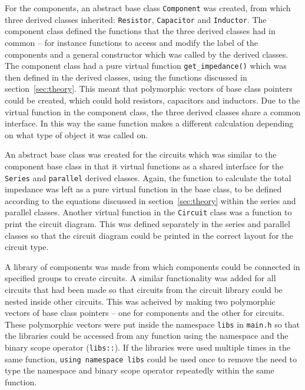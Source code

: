 \renewcommand{\lstlistingname}{Code snippet}

For the components, an abstract base class \verb!Component! was created, from which three derived classes inherited: \verb!Resistor!, \verb!Capacitor! and \verb!Inductor!. The component class defined the functions that the three derived classes had in common -- for instance functions to access and modify the label of the components and a general constructor which was called by the derived classes. The component class had a pure virtual function \verb!get_impedance()! which was then defined in the derived classes, using the functions discussed in section~\ref{sec:theory}. This meant that polymorphic vectors of base class pointers could be created, which could hold resistors, capacitors and inductors. Due to the virtual function in the component class, the three derived classes share a common interface. In this way the same function makes a different calculation depending on what type of object it was called on.

An abstract base class was created for the circuits which was similar to the component base class in that it virtual functions as a shared interface for the \verb!Series! and \verb!parallel! derived classes. Again, the function to calculate the total impedance was left as a pure virtual function in the base class, to be defined according to the equations discussed in section~\ref{sec:theory} within the series and parallel classes. Another virtual function in the \verb!Circuit! class was a function to print the circuit diagram. This was defined separately in the series and parallel classes so that the circuit diagram could be printed in the correct layout for the circuit type.

A library of components was made from which components could be connected in specified groups to create circuits. A similar functionality was added for all circuits that had been made so that circuits from the circuit library could be nested inside other circuits. This was acheived by making two polymorphic vectors of base class pointers -- one for components and the other for circuits. These polymorphic vectors were put inside the namespace \verb!libs! in \verb!main.h! so that the libraries could be accessed from any function using the namespace and the binary scope operator (\verb!libs::!). If the libraries were used multiple times in the same function, \verb!using namespace libs! could be used once to remove the need to type the namespace and binary scope operator repeatedly within the same function.

